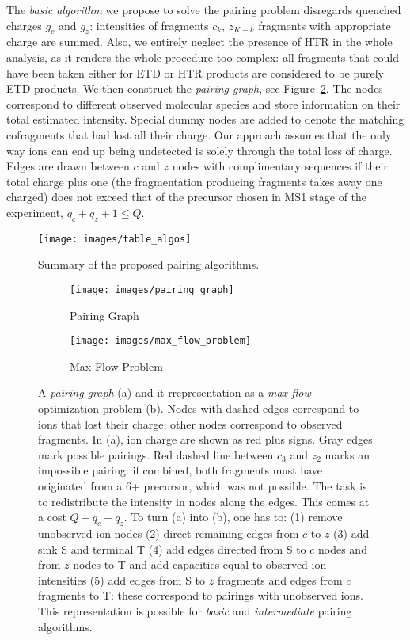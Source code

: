 \documentclass[journal=ancham, manuscript=article, layout=twocolumn]{achemso}
\begin{document}
The \textit{basic algorithm} we propose to solve the pairing problem disregards quenched charges $g_c$ and $g_z$: intensities of fragments $c_k$, $z_{K-k}$ fragments with appropriate charge are summed.
Also, we entirely neglect the presence of HTR in the whole analysis, as it renders the whole procedure too complex: all fragments that could have been taken either for ETD or HTR products are considered to be purely ETD products. 
We then construct the \textit{pairing graph}, see Figure~\ref{fig::pairing graph}. 
The nodes correspond to different observed molecular species and store information on their total estimated intensity.
Special dummy nodes are added to denote the matching cofragments that had lost all their charge.
Our approach assumes that the only way ions can end up being undetected is solely through the total loss of charge.
Edges are drawn between $c$ and $z$ nodes with complimentary sequences if their total charge plus one (the fragmentation producing fragments takes away one charged) does not exceed that of the precursor chosen in MS1 stage of the experiment, $q_c + q_z + 1 \leq Q$. 
\begin{figure}[t]
    \texttt{[image: images/table\_algos]}
    \caption{Summary of the proposed pairing algorithms.}\label{fig::algorithms}
\end{figure}

\begin{figure*}[t]
	\begin{subfigure}[b]{0.49\linewidth}
		\centering
		\texttt{[image: images/pairing\_graph]}
		\caption{Pairing Graph}
        \label{fig::pairing graph}
	\end{subfigure}
	\begin{subfigure}[b]{0.49\linewidth}
		\centering
		\texttt{[image: images/max\_flow\_problem]}
		\caption{Max Flow Problem}
        \label{fig::max flow problem}
	\end{subfigure}
	\caption{ A \textit{pairing graph} (a) and it rrepresentation as a \textit{max flow} optimization problem (b). Nodes with dashed edges correspond to ions that lost their charge; other nodes correspond to observed fragments. In (a), ion charge are shown as red plus signs. Gray edges mark possible pairings. Red dashed line between $c_3$ and $z_2$ marks an impossible pairing: if combined, both fragments must have originated from a 6+ precursor, which was not possible. The task is to redistribute the intensity in nodes along the edges. This comes at a cost $Q - q_c - q_z$. To turn (a) into (b), one has to: (1) remove unobserved ion nodes (2) direct remaining edges from $c$ to $z$ (3) add sink S and terminal T (4) add edges directed from S to $c$ nodes and from $z$ nodes to T and add capacities equal to observed ion intensities (5) add edges from S to $z$ fragments and edges from $c$ fragments to T: these correspond to pairings with unobserved ions. This representation is possible for \textit{basic} and \textit{intermediate} pairing algorithms.
	}\label{fig::pairing to max flow}
\end{figure*}
\end{document}
